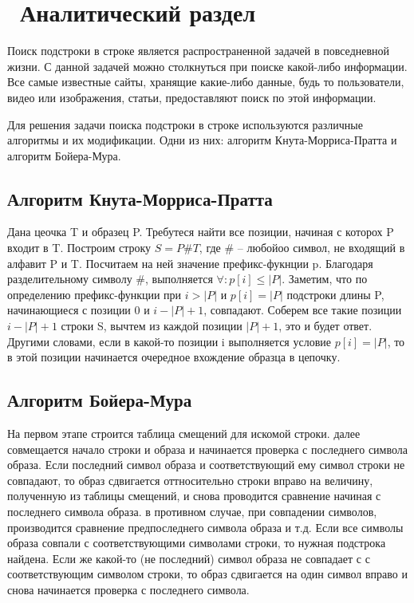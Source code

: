 \chapter{ Аналитический раздел}
\label{cha:analysis}

Поиск подстроки в строке является распространенной задачей в повседневной жизни. С данной задачей можно столкнуться при поиске какой-либо информации. Все самые известные сайты, хранящие какие-либо данные, будь то пользователи, видео или изображения, статьи, предоставляют поиск по этой информации.

Для решения задачи поиска подстроки в строке используются различные алгоритмы и их модификации. Одни из них: алгоритм Кнута-Морриса-Пратта и алгоритм Бойера-Мура.

\section { Алгоритм Кнута-Морриса-Пратта}

Дана цеочка T и образец P. Требутеся найти все позиции, начиная с которох P входит в T. Построим строку $S=P\#T$, где $\#$ -- любойоо символ, не входящий в алфавит P
и T. Посчитаем на ней значение префикс-фукнции p. Благодаря разделительному символу \#, выполняется $\forall :p[i] \leq |P|$. Заметим, что по определению префикс-функции при $i > |P|$ и $p[i]=|P|$ подстроки длины P, начинающиеся с позиции 0 и $i-|P|+1$, совпадают. Соберем все такие позиции $i-|P|+1$ строки S, вычтем из каждой позиции $|P|+1$, это и будет ответ. Другими словами, если в какой-то позиции i выполняется условие $p[i]=|P|$, то в этой позиции начинается очередное вхождение образца в цепочку.

\section { Алгоритм Бойера-Мура}

На первом этапе строится таблица смещений для искомой строки. далее совмещается начало строки и образа и начинается проверка с последнего символа образа. Если последний символ образа и соответствующий ему символ строки не совпадают, то образ сдвигается оттносительно строки вправо на величину, полученную из таблицы смещений, и снова проводится сравнение начиная с последнего символа образа. в противном случае, при совпадении символов, производится сравнение предпоследнего символа образа и т.д. Если все символы образа совпали с соответствующими символами строки, то нужная подстрока найдена. Если же какой-то (не последний) символ образа не совпадает с с соответствующим символом строки, то образ сдвигается на один символ вправо и снова начинается проверка с последнего символа.

